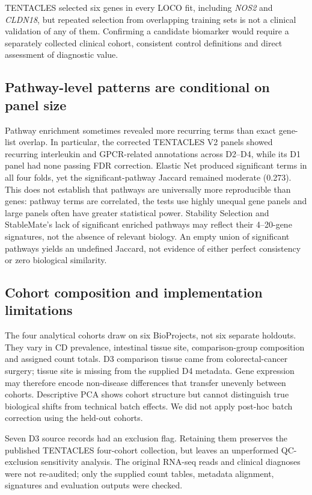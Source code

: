 TENTACLES selected six genes in every LOCO fit, including \textit{NOS2} and \textit{CLDN18}, but repeated selection from overlapping training sets is not a clinical validation of any of them. Confirming a candidate biomarker would require a separately collected clinical cohort, consistent control definitions and direct assessment of diagnostic value.

\subsection{Pathway-level patterns are conditional on panel size}
\label{sec:discussion_pathway}
Pathway enrichment sometimes revealed more recurring terms than exact gene-list overlap. In particular, the corrected TENTACLES V2 panels showed recurring interleukin and GPCR-related annotations across D2--D4, while its D1 panel had none passing FDR correction. Elastic Net produced significant terms in all four folds, yet the significant-pathway Jaccard remained moderate (0.273). This does not establish that pathways are universally more reproducible than genes: pathway terms are correlated, the tests use highly unequal gene panels and large panels often have greater statistical power. Stability Selection and StableMate's lack of significant enriched pathways may reflect their 4--20-gene signatures, not the absence of relevant biology. An empty union of significant pathways yields an undefined Jaccard, not evidence of either perfect consistency or zero biological similarity.

\subsection{Cohort composition and implementation limitations}
\label{sec:discussion_limits}
The four analytical cohorts draw on six BioProjects, not six separate holdouts. They vary in CD prevalence, intestinal tissue site, comparison-group composition and assigned count totals. D3 comparison tissue came from colorectal-cancer surgery; tissue site is missing from the supplied D4 metadata. Gene expression may therefore encode non-disease differences that transfer unevenly between cohorts. Descriptive PCA shows cohort structure but cannot distinguish true biological shifts from technical batch effects. We did not apply post-hoc batch correction using the held-out cohorts.

Seven D3 source records had an exclusion flag. Retaining them preserves the published TENTACLES four-cohort collection, but leaves an unperformed QC-exclusion sensitivity analysis. The original RNA-seq reads and clinical diagnoses were not re-audited; only the supplied count tables, metadata alignment, signatures and evaluation outputs were checked.

